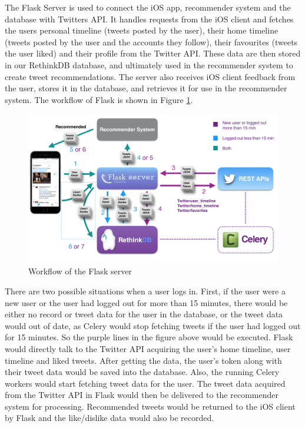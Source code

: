 \documentclass{article}
\begin{document}
The Flask Server is used to connect the iOS app, recommender system and the database with Twitters API. It handles requests from the iOS client and fetches the users personal timeline (tweets posted by the user), their home timeline (tweets posted by the user and the accounts they follow), their favourites (tweets the user liked) and their profile from the Twitter API. These data are then stored in our RethinkDB database, and ultimately used in the recommender system to create tweet recommendations. The server also receives iOS client feedback from the user, stores it in the database, and retrieves it for use in the recommender system. The workflow of Flask is shown in Figure \ref{lab:flask-server}.

\begin{figure}[H]
    \centering
    \includegraphics[width=1.0\textwidth]{flask_workflow}  
    \caption{Workflow of the Flask server}
    \label{lab:flask-server}
\end{figure}

There are two possible situations when a user logs in. First, if the user were a new user or the user had logged out for more than 15 minutes, there would be either no record or tweet data for the user in the database, or the tweet data would out of date, as Celery would stop fetching tweets if the user had logged out for 15 minutes. So the purple lines in the figure above would be executed. Flask would directly talk to the Twitter API acquiring the user’s home timeline, user timeline and liked tweets. After getting the data, the user’s token along with their tweet data would be saved into the database. Also, the running Celery workers would start fetching tweet data for the user. The tweet data acquired from the Twitter API in Flask would then be delivered to the recommender system for processing. Recommended tweets would be returned to the iOS client by Flask and the like/dislike data would also be recorded. 
\end{document}
